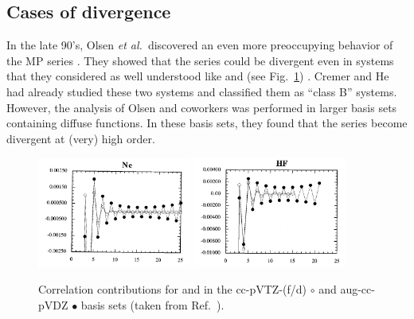 \documentclass[11pt,a4paper]{article}
\begin{document}
\subsection{Cases of divergence}

In the late 90's, Olsen \textit{et al.}~discovered an even more preoccupying behavior of the MP series \cite{Olsen_1996}. They showed that the series could be divergent even in systems that they considered as well understood like  and  (see Fig.~\ref{fig:NeHFDiv}) \cite{Olsen_1996, Christiansen_1996}. Cremer and He had already studied these two systems and classified them as ``class B'' systems. However, the analysis of Olsen and coworkers was performed in larger basis sets containing diffuse functions. In these basis sets, they found that the series become divergent at (very) high order.

\begin{figure}[h!]
    \centering
    \includegraphics[width=0.45\textwidth]{Nedivergence.png}
    \includegraphics[width=0.45\textwidth]{HFdivergence.png}
    \caption{\centering Correlation contributions for  and  in the cc-pVTZ-(f/d) $\circ$ and aug-cc-pVDZ $\bullet$ basis sets (taken from Ref.~\cite{Olsen_1996}).}
    \label{fig:NeHFDiv}
\end{figure}
\end{document}
